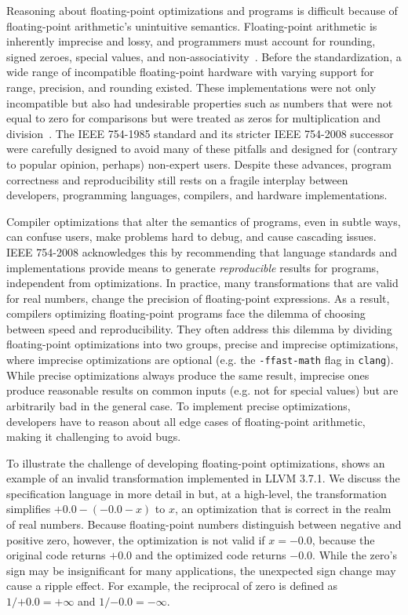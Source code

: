 \documentclass[preprint, numbers]{sigplanconf}
\begin{document}
Reasoning about floating-point optimizations and programs is difficult because
of floating-point arithmetic's unintuitive semantics. Floating-point arithmetic
is inherently imprecise and lossy, and programmers must account for rounding,
signed zeroes, special values, and non-associativity~\cite{goldberg1991every}.
Before the standardization, a wide range of incompatible floating-point
hardware with varying support for range, precision, and rounding existed. These
implementations were not only incompatible but also had undesirable properties
such as numbers that were not equal to zero for comparisons but were treated as
zeros for multiplication and division~\cite{severance1998interview}. The IEEE
754-1985 standard and its stricter IEEE 754-2008 successor were carefully
designed to avoid many of these pitfalls and designed for (contrary to popular
opinion, perhaps) non-expert users. Despite these advances, program correctness
and reproducibility still rests on a fragile interplay between developers,
programming languages, compilers, and hardware implementations.

Compiler optimizations that alter the semantics of programs, even in subtle
ways, can confuse users, make problems hard to debug, and cause cascading
issues. IEEE 754-2008 acknowledges this by recommending that language standards
and implementations provide means to generate \textit{reproducible} results for
programs, independent from optimizations. In practice, many transformations
that are valid for real numbers, change the precision of floating-point
expressions. As a result, compilers optimizing floating-point programs face the
dilemma of choosing between speed and reproducibility. They often address this
dilemma by dividing floating-point optimizations into two groups, precise and
imprecise optimizations, where imprecise optimizations are optional (e.g. the
\texttt{-ffast-math} flag in \texttt{clang}). While precise optimizations
always produce the same result, imprecise ones produce reasonable results on
common inputs (e.g. not for special values) but are arbitrarily bad in the
general case. To implement precise optimizations, developers have to reason
about all edge cases of floating-point arithmetic, making it challenging to
avoid bugs.

To illustrate the challenge of developing floating-point optimizations,
 shows an example of an invalid transformation implemented in
LLVM 3.7.1. We discuss the specification language in more detail in
 but, at a high-level, the transformation simplifies ${+0.0} -
({-0.0} - x)$ to $x$, an optimization that is correct in the realm of real
numbers. Because floating-point numbers distinguish between negative and
positive zero, however, the optimization is not valid if $x = {-0.0}$, because
the original code returns $+0.0$ and the optimized code returns ${-0.0}$. While
the zero's sign may be insignificant for many applications, the unexpected sign
change may cause a ripple effect. For example, the reciprocal of zero is
defined as $1 / {+0.0} = {+\infty}$ and $1 / {-0.0} = {-\infty}$.
\end{document}
